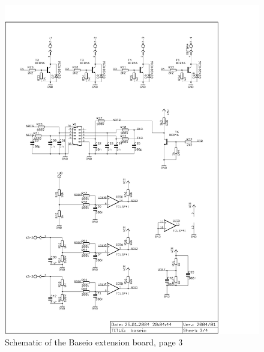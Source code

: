 \begin{figure}
    \centering
    \includegraphics[scale=0.68]{appendix/baseio_p3}
    \caption{Schematic of the Baseio extension board, page 3}
\end{figure}
